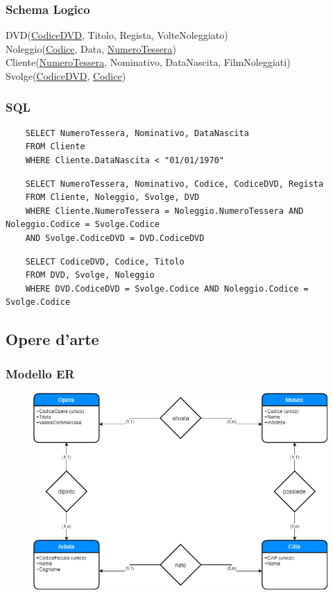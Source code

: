 \documentclass{article}
\begin{document}
	\subsubsection{Schema Logico}
	DVD(\underline{CodiceDVD}, Titolo, Regista, VolteNoleggiato)\\
	Noleggio(\underline{Codice}, Data, \underline{NumeroTessera})\\
	Cliente(\underline{NumeroTessera}, Nominativo, DataNascita, FilmNoleggiati)\\
	Svolge(\underline{CodiceDVD}, \underline{Codice})
	\subsubsection{SQL}
	\begin{verbatim}
	SELECT NumeroTessera, Nominativo, DataNascita
	FROM Cliente
	WHERE Cliente.DataNascita < "01/01/1970"
	\end{verbatim}
	\begin{verbatim}
	SELECT NumeroTessera, Nominativo, Codice, CodiceDVD, Regista
	FROM Cliente, Noleggio, Svolge, DVD
	WHERE Cliente.NumeroTessera = Noleggio.NumeroTessera AND Noleggio.Codice = Svolge.Codice 
	AND Svolge.CodiceDVD = DVD.CodiceDVD 
	\end{verbatim}
	\begin{verbatim}
	SELECT CodiceDVD, Codice, Titolo
	FROM DVD, Svolge, Noleggio
	WHERE DVD.CodiceDVD = Svolge.Codice AND Noleggio.Codice = Svolge.Codice
	\end{verbatim}

	\pagebreak
	
	\subsection{Opere d'arte}
	\subsubsection{Modello ER}
	\begin{figure}[h!]
		\centering
		\includegraphics[scale=0.5]{images/Opera.png}
	\end{figure}
\end{document}
